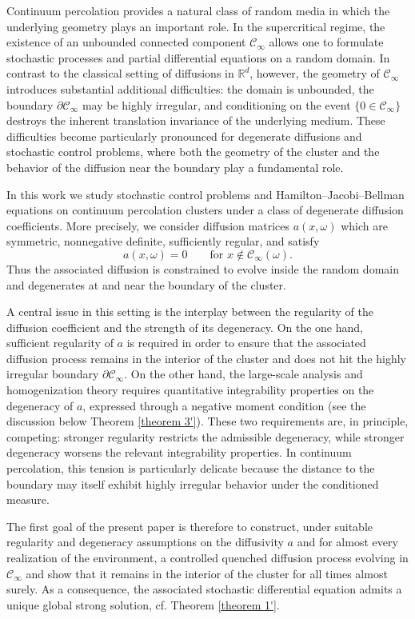 \documentclass[11pt]{article}
\newcommand{\R}{\mathbb R}
\theoremstyle{rem}
\begin{document}
Continuum percolation provides a natural class of random media in which the underlying geometry 
plays an important role. In the supercritical regime, the existence of an unbounded connected 
component $\mathcal C_\infty$ allows one to formulate stochastic processes and partial 
differential equations on a random domain. In contrast to the classical setting of 
diffusions in $\R^d$, however, the geometry of $\mathcal C_\infty$ introduces substantial 
additional difficulties: the domain is unbounded, the boundary $\partial\mathcal C_\infty$ 
may be highly irregular, and conditioning on the event $\{0\in\mathcal C_\infty\}$ destroys 
the inherent translation invariance of the underlying medium. These difficulties become 
particularly pronounced for degenerate diffusions and stochastic control problems, where both 
the geometry of the cluster and the behavior of the diffusion near the boundary play a 
fundamental role.

In this work we study stochastic control problems and Hamilton--Jacobi--Bellman equations on 
continuum percolation clusters under a class of degenerate diffusion coefficients. More precisely, 
we consider diffusion matrices $a(x,\omega)$ which are symmetric, nonnegative definite, 
sufficiently regular, and satisfy
\[
a(x,\omega)=0 \qquad\mbox{for } x\notin \mathcal C_\infty(\omega).
\]
Thus the associated diffusion is constrained to evolve inside the random domain and degenerates at and near the boundary of the cluster.

A central issue in this setting is the interplay between the regularity of the diffusion coefficient and the strength of its degeneracy. On the one hand, sufficient regularity of $a$ is required in order to ensure that the associated diffusion process remains in the interior of the cluster and does not hit the highly irregular boundary $\partial\mathcal C_\infty$. On the other hand, the large-scale analysis and homogenization theory  requires quantitative integrability properties on the degeneracy of $a$, expressed through a negative moment condition (see the discussion below Theorem \ref{theorem 3'}). These two requirements are, in principle, competing: stronger regularity restricts the admissible degeneracy, while stronger degeneracy worsens the relevant integrability properties. In continuum percolation, this tension is particularly delicate because the distance to the boundary may itself exhibit highly irregular behavior under the conditioned measure.

The first goal of the present paper is therefore to construct, under suitable regularity and degeneracy assumptions on the diffusivity $a$ and for almost every realization of the environment, a controlled quenched diffusion process evolving in $\mathcal C_\infty$ and show that it remains in the interior of the cluster for all times almost surely. As a consequence, the associated stochastic differential equation admits a unique global strong solution, cf. Theorem \ref{theorem 1'}. 
\end{document}
